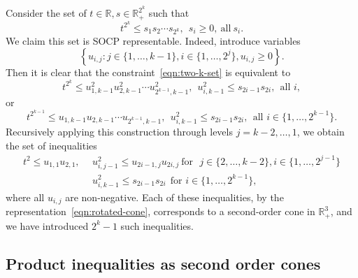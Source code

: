 \documentclass[11pt]{article}
\newcommand{\R}{\mathbb{R}}
\begin{document}
Consider the set of $t \in \R, s \in \R^{2^k}_+$ such that
\begin{equation}
  \label{eqn:two-k-set}
  t^{2^k} \le s_1 s_2 \cdots s_{2^k},
  ~~ s_i \ge 0, ~ \mbox{all}~ s_i.
\end{equation}
We claim this set is SOCP representable. Indeed,
introduce variables
\begin{equation*}
  \left\{u_{i,j} :
  j \in \{1, \ldots, k-1\},
  i \in \{1, \ldots, 2^j\},
  u_{i,j} \ge 0\right\}.
\end{equation*}
Then it is clear that the constraint~\eqref{eqn:two-k-set}
is equivalent to
\begin{equation*}
  t^{2^k} \le u_{1, k-1}^2 u_{2,k-1}^2 \cdots u_{2^{k-1}, k-1}^2,
  ~~ u_{i, k-1}^2 \le s_{2i - 1} s_{2i},
  ~~ \mbox{all~} i,
\end{equation*}
or
\begin{equation*}
  t^{2^{k-1}} \le u_{1, k-1} u_{2,k-1} \cdots u_{2^{k-1}, k-1},
  ~~ u_{i, k-1}^2 \le s_{2i - 1} s_{2i},
  ~~ \mbox{all~} i \in \{1, \ldots, 2^{k-1}\}.
\end{equation*}
Recursively applying this construction through levels $j = k-2, \ldots,
1$, we obtain the set of inequalities
\begin{align}
  t^2 \le u_{1,1} u_{2,1},
  & ~~ u_{i,j-1}^2 \le u_{2i-1, j} u_{2i,j}
  ~ \mbox{for ~} j \in \{2, \ldots, k-2\}, i \in \{1, \ldots, 2^{j-1}\}
  \nonumber \\
  & ~~ u_{i, k-1}^2 \le s_{2i - 1} s_{2i}
  ~~ \mbox{for~} i \in \{1, \ldots, 2^{k-1}\}, \label{eqn:socp-two-k-set}
\end{align}
where all $u_{i,j}$ are non-negative. Each of these inequalities, by the
representation~\eqref{eqn:rotated-cone}, corresponds to a second-order
cone in $\R_+^3$, and we have introduced $2^k - 1$ such inequalities.


\subsection*{Product inequalities as second order cones}
\end{document}
